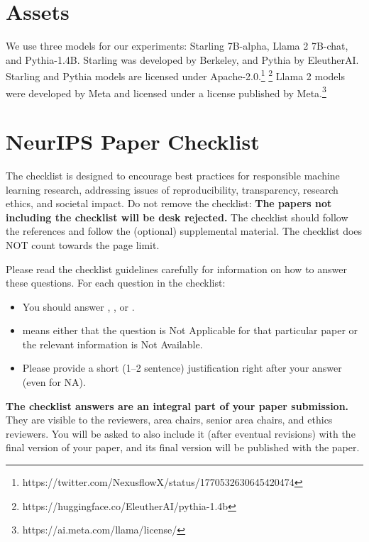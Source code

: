 \documentclass{article}
\begin{document}
\section{Assets}

We use three models for our experiments: Starling 7B-alpha, Llama 2 7B-chat, and Pythia-1.4B. Starling was developed by Berkeley, and Pythia by EleutherAI. Starling and Pythia models are licensed under Apache-2.0.\footnote{https://twitter.com/NexusflowX/status/1770532630645420474} \footnote{https://huggingface.co/EleutherAI/pythia-1.4b} Llama 2 models were developed by Meta and licensed under a license published by Meta.\footnote{https://ai.meta.com/llama/license/} 


\newpage
\section*{NeurIPS Paper Checklist}

The checklist is designed to encourage best practices for responsible machine learning research, addressing issues of reproducibility, transparency, research ethics, and societal impact. Do not remove the checklist: {\bf The papers not including the checklist will be desk rejected.} The checklist should follow the references and follow the (optional) supplemental material.  The checklist does NOT count towards the page
limit. 

Please read the checklist guidelines carefully for information on how to answer these questions. For each question in the checklist:
\begin{itemize}
    \item You should answer \answerYes{}, \answerNo{}, or \answerNA{}.
    \item \answerNA{} means either that the question is Not Applicable for that particular paper or the relevant information is Not Available.
    \item Please provide a short (1–2 sentence) justification right after your answer (even for NA). 
\end{itemize}

{\bf The checklist answers are an integral part of your paper submission.} They are visible to the reviewers, area chairs, senior area chairs, and ethics reviewers. You will be asked to also include it (after eventual revisions) with the final version of your paper, and its final version will be published with the paper.
\end{document}
